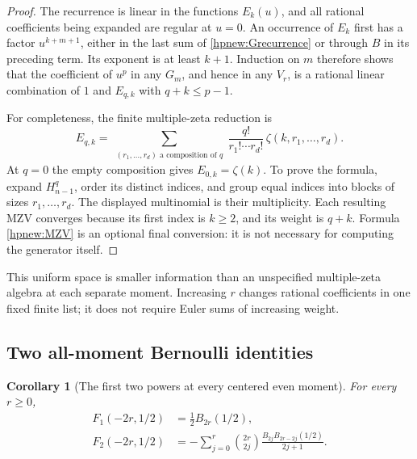 \documentclass[11pt,a4paper]{article}
\numberwithin{equation}{section}
\newtheorem{corollary}[theorem]{Corollary}
\theoremstyle{definition}
\theoremstyle{remark}
\begin{document}
\begin{proof}
The recurrence is linear in the functions $E_k(u)$, and all rational
coefficients being expanded are regular at $u=0$.
An occurrence of $E_k$ first has a factor $u^{k+m+1}$, either in
the last sum of \eqref{hpnew:Grecurrence} or through $B$ in its
preceding term. Its exponent is at least $k+1$.
Induction on $m$ therefore shows that the coefficient of $u^p$ in
any $G_m$, and hence in any $V_r$, is a rational linear combination
of $1$ and $E_{q,k}$ with $q+k\le p-1$.

For completeness, the finite multiple-zeta reduction is
\begin{equation}\label{hpnew:MZV}
 E_{q,k}=\sum_{\substack{(r_1,\ldots,r_d)\text{ a composition of }q}}
       \frac{q!}{r_1!\cdots r_d!}\,
                          \zeta(k,r_1,\ldots,r_d).
\end{equation}
At $q=0$ the empty composition gives $E_{0,k}=\zeta(k)$.
To prove the formula, expand $H_{n-1}^q$, order its distinct indices,
and group equal indices into blocks of sizes $r_1,\ldots,r_d$.
The displayed multinomial is their multiplicity. Each resulting MZV
converges because its first index is $k\ge2$, and its weight is
$q+k$. Formula \eqref{hpnew:MZV} is an optional final conversion:
it is not necessary for computing the generator itself.
\end{proof}

This uniform space is smaller information than an unspecified
multiple-zeta algebra at each separate moment. Increasing $r$ changes
rational coefficients in one fixed finite list; it does not require
Euler sums of increasing weight.

\subsection{Two all-moment Bernoulli identities}

\begin{corollary}[The first two powers at every centered even moment]
\label{hpnew:Bernoulli}
For every $r\ge0$,
\begin{align}
 F_1(-2r,1/2)&=\frac12 B_{2r}(1/2),\label{hpnew:firstpower}\\
 F_2(-2r,1/2)&=-\sum_{j=0}^{r}\binom{2r}{2j}
       \frac{B_{2j}B_{2r-2j}(1/2)}{2j+1}.
                         \label{hpnew:secondpower}
\end{align}
\end{corollary}
\end{document}
